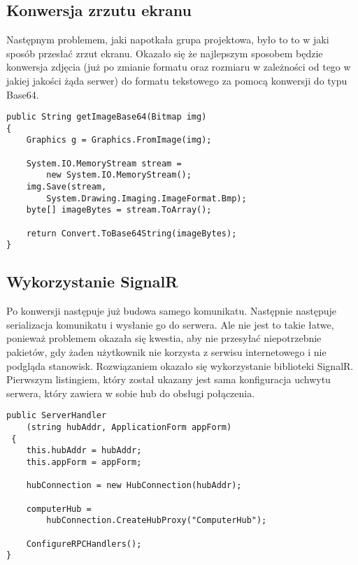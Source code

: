 \subsection{Konwersja zrzutu ekranu}

Następnym problemem, jaki napotkała grupa projektowa, było to to w jaki sposób przesłać zrzut ekranu. Okazało się że najlepszym sposobem będzie konwersja zdjęcia (już po zmianie formatu oraz rozmiaru w zależności od tego w jakiej jakości żąda serwer) do formatu tekstowego za pomocą konwersji do typu Base64. 

\newline
\begin{lstlisting}[frame=single,captionpos=b,
    caption={Fragment kodu odpowiedzialny za konwersję obrazu.},
    label={lst:kod1},
    style=sharpc]
public String getImageBase64(Bitmap img)
{
    Graphics g = Graphics.FromImage(img);
    
    System.IO.MemoryStream stream = 
        new System.IO.MemoryStream();
    img.Save(stream, 
        System.Drawing.Imaging.ImageFormat.Bmp);
    byte[] imageBytes = stream.ToArray();
    
    return Convert.ToBase64String(imageBytes);       
}
\end{lstlisting}

\subsection{Wykorzystanie SignalR}
Po konwersji następuje już budowa samego komunikatu. Następnie następuje serializacja komunikatu i wysłanie go do serwera. Ale nie jest to takie łatwe, ponieważ problemem okazała się kwestia, aby nie przesyłać niepotrzebnie pakietów, gdy żaden użytkownik nie korzysta z serwisu internetowego i nie podgląda stanowisk. Rozwiązaniem okazało się wykorzystanie biblioteki SignalR. Pierwszym listingiem, który został ukazany jest sama konfiguracja uchwytu serwera, który zawiera w sobie hub do obsługi połączenia.

\newpage
\newline
\begin{lstlisting}[frame=single,captionpos=b,
    caption={Fragment kodu - konstruktor klasy ServerHandler},
    label={lst:kod1},
    style=sharpc]
public ServerHandler
    (string hubAddr, ApplicationForm appForm)
 {
    this.hubAddr = hubAddr;
    this.appForm = appForm;
    
    hubConnection = new HubConnection(hubAddr);
    
    computerHub = 
        hubConnection.CreateHubProxy("ComputerHub");
        
    ConfigureRPCHandlers();
}
\end{lstlisting}

